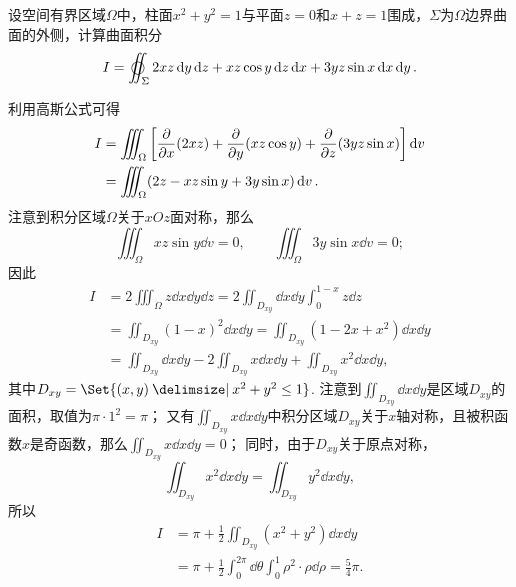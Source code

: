 \begin{example}
设空间有界区域\(\Omega\)中，柱面\(x^2+y^2=1\)与平面\(z=0\)和\(x+z=1\)围成，\(\Sigma\)为\(\Omega\)边界曲面的外侧，计算曲面积分\[
I = \varoiint_\Sigma 2xz \dd{y}\dd{z} + xz \cos y \dd{z}\dd{x} + 3yz \sin x \dd{x}\dd{y}.
\]
\begin{solution}
利用高斯公式可得
\begin{align*}
I &= \iiint_\Omega \left[ \pdv{x}(2xz) + \pdv{y}(xz \cos y) + \pdv{z}(3yz \sin x) \right] \dd{v} \\
&= \iiint_\Omega (2z - xz \sin y + 3y \sin x) \dd{v}.
\end{align*}
注意到积分区域\(\Omega\)关于\(xOz\)面对称，那么\[
\iiint_\Omega xz \sin y \dd{v} = 0,
\qquad
\iiint_\Omega 3y \sin x \dd{v} = 0;
\]因此\begin{align*}
I &= 2 \iiint_\Omega z \dd{x}\dd{y}\dd{z}
= 2 \iint_{D_{xy}} \dd{x}\dd{y} \int_0^{1-x} z \dd{z} \\
&= \iint_{D_{xy}} (1-x)^2 \dd{x}\dd{y}
= \iint_{D_{xy}} (1-2x+x^2) \dd{x}\dd{y} \\
&= \iint_{D_{xy}} \dd{x}\dd{y}
- 2 \iint_{D_{xy}} x \dd{x}\dd{y}
+ \iint_{D_{xy}} x^2 \dd{x}\dd{y},
\end{align*}
其中\(D_{xy} = \Set{(x,y) \given x^2+y^2\leq1}\).
注意到\(\iint_{D_{xy}} \dd{x}\dd{y}\)是区域\(D_{xy}\)的面积，取值为\(\pi\cdot1^2=\pi\)；
又有\(\iint_{D_{xy}} x \dd{x}\dd{y}\)中积分区域\(D_{xy}\)关于\(x\)轴对称，且被积函数\(x\)是奇函数，那么\(\iint_{D_{xy}} x \dd{x}\dd{y} = 0\)；
同时，由于\(D_{xy}\)关于原点对称，\[
\iint_{D_{xy}} x^2 \dd{x}\dd{y} = \iint_{D_{xy}} y^2 \dd{x}\dd{y},
\]所以\begin{align*}
I &= \pi + \frac{1}{2} \iint_{D_{xy}} (x^2+y^2) \dd{x}\dd{y} \\
&= \pi + \frac{1}{2}
	\int_0^{2\pi} \dd{\theta} \int_0^1 \rho^2 \cdot \rho\dd{\rho}
= \frac{5}{4} \pi.
\end{align*}
\end{solution}
\end{example}

